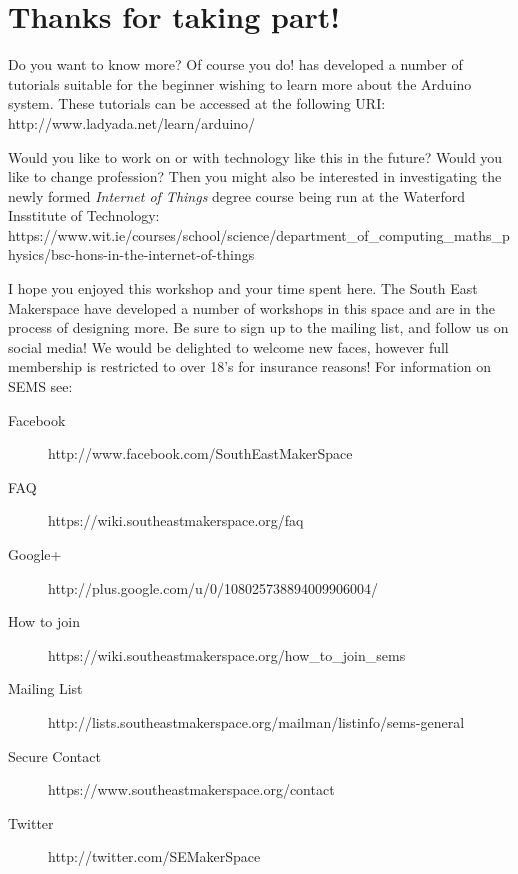 \newpage
\chapter*{Thanks for taking part!}

Do you want to know more? Of course you do! \citet{fried-12} has developed a number of tutorials suitable for the beginner wishing to learn more about the \gls{Arduino} system. These tutorials can be accessed at the following URI: http://www.ladyada.net/learn/arduino/

Would you like to work on or with technology like this in the future? Would you like to change profession? Then you might also be interested in investigating the newly formed \textit{Internet of Things} degree course being run at the Waterford Insstitute of Technology: https://www.wit.ie/courses/school/science/department\_of\_computing\_maths\_physics/bsc-hons-in-the-internet-of-things

I hope you enjoyed this workshop and your time spent here. The South East Makerspace have developed a number of workshops in this space and are in the process of designing more. Be sure to sign up to the mailing list, and follow us on social media!  We would be delighted to welcome new faces, however full membership is restricted to over 18's for insurance reasons! For information on SEMS see:

\begin{description}
	\item[Facebook] http://www.facebook.com/SouthEastMakerSpace
	\item[FAQ] https://wiki.southeastmakerspace.org/faq
	\item[Google+] http://plus.google.com/u/0/108025738894009906004/
	\item[How to join] https://wiki.southeastmakerspace.org/how\_to\_join\_sems
	\item[Mailing List] http://lists.southeastmakerspace.org/mailman/listinfo/sems-general
	\item[Secure Contact] https://www.southeastmakerspace.org/contact
	\item[Twitter] http://twitter.com/SEMakerSpace
\end{description} 





